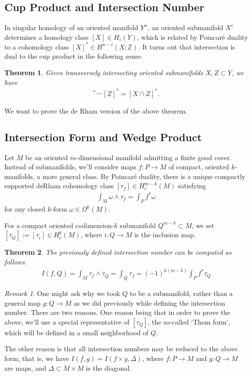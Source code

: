 \documentclass[12pt]{amsart}
\newtheorem{theorem}{Theorem}
\theoremstyle{remark}
\newtheorem{remark}{Remark}
\begin{document}
 \subsection{Cup Product and Intersection Number}
 In singular homology of an oriented manifold $Y^n$, an oriented submanifold $X^{i} $ determines a homology class $ [X] \in H_i (Y)$, which is related by Poincaré duality to a cohomology class $ [X]^\ast \in H^{n-i} (X ; \mathbb{Z} )$. It turns out that intersection is dual to the cup product in the following sense. 
 \begin{theorem}
     Given transversely intersecting oriented submanifolds $X, Z \subset Y$, we have 
     \begin{align*}
         [X]^\ast \smile [Z]^\ast = [X \cap Z]^\ast.
     \end{align*}
 \end{theorem}
 We want to prove the de Rham version of the above theorem. 
 \subsection{Intersection Form and Wedge Product}
 Let $M$ be an oriented $m$-dimensional manifold admitting a finite good cover. Instead of submanifolds, we'll consider maps $ f: P \xrightarrow{} M$ of  compact, oriented $k$-manifolds, a more general class. By Poincaré duality, there is a unique compactly supported deRham cohomology class $[ \tau_f] \in H^{m-k}_c (M)$ satisfying
 \begin{align*}
     \int_{M} \omega \wedge \tau_f = \int_{P} f^\ast \omega 
 \end{align*}
 for any closed $k$-form $ \omega \in \Omega^k (M)$.

 For a compact oriented codimension-$k$ submanifold $ Q^{m-k} \subset M$, we set $[ \tau_{Q}] := [\tau_{i}] \in H^{k}_{c}(M)$, where $ i : Q \rightarrow M$ is the inclusion map. 

\begin{theorem}
    The previously defined intersection number can be computed as follows.
\begin{align*}
    I( f, Q) = \int_{M} \tau_f \wedge \tau_Q = \int_{Q} \tau_f = (-1)^{k(m-k)}\int_{P}  f^\ast \tau_Q 
\end{align*}
\end{theorem}
\begin{remark}
One might ask why we took $Q $ to be a submanifold, rather than a general map $g: Q \rightarrow M$ as we did previously while defining the intersection number. There are two reasons. One reason being that in order to prove the above, we'll use a special representative of $ [\tau_Q]$, the so-called `Thom form', which will be defined in a small neighborhood of $Q$. 

The other reason is that all intersection numbers may be reduced to the above form, that is, we have $ I ( f, g) = I( f \times g, \Delta)$, where $f: P \rightarrow M$ and $ g: Q \rightarrow M$ are maps, and $ \Delta  \subset M \times M$ is the diagonal. 
\end{remark}
\end{document}
